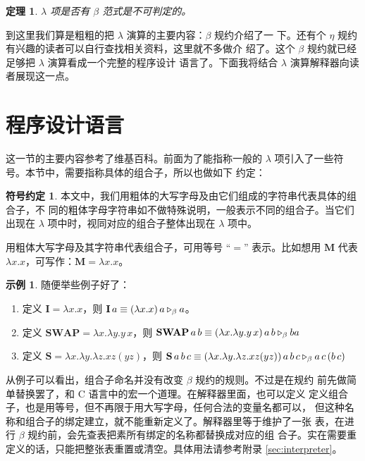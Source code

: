 \documentclass[a4paper,adobefonts]{ctexart}
\newenvironment{tightenum}{
  \begin{enumerate}
    \setlength{\itemindent}{2\ccwd}
    \setlength{\itemsep}{0cm}
    \setlength{\parskip}{0cm}
}{
  \end{enumerate}
}
\newtheorem{theorem}{定理}
\theoremstyle{definition}
\newtheorem{example}{示例}
\newtheorem{notation}{符号约定}
\begin{document}
\begin{theorem}
  $\lambda$ 项是否有 $\beta$ 范式是不可判定的。
\end{theorem}

到这里我们算是粗粗的把 $\lambda$ 演算的主要内容：$\beta$ 规约介绍了一
下。还有个 $\eta$ 规约有兴趣的读者可以自行查找相关资料，这里就不多做介
绍了。这个 $\beta$ 规约就已经足够把 $\lambda$ 演算看成一个完整的程序设计
语言了。下面我将结合 $\lambda$ 演算解释器向读者展现这一点。

\section{程序设计语言}
这一节的主要内容参考了维基百科\cite{wiki:lambda}。前面为了能指称一般的
$\lambda$ 项引入了一些符号。本节中，需要指称具体的组合子，所以也做如下
约定：
\begin{notation}\label{notation:combinator}
  本文中，我们用粗体的大写字母及由它们组成的字符串代表具体的组合子，不
  同的粗体字母字符串如不做特殊说明，一般表示不同的组合子。当它们出现在
  $\lambda$ 项中时，视同对应的组合子整体出现在 $\lambda$ 项中。

  用粗体大写字母及其字符串代表组合子，可用等号 ``$=$'' 表示。比如想用
  $\mathbf{M}$ 代表 $\lambda x.x$，可写作：$\mathbf{M}=\lambda x.x$。
\end{notation}
\begin{example}
随便举些例子好了：
\begin{tightenum}
\item 定义 $\mathbf{I}=\lambda x.x$，则 $\mathbf{I}\,a \equiv (\lambda
  x.x)\,a \triangleright_\beta a$。
\item 定义 $\mathbf{SWAP}=\lambda x.\lambda y.y\,x$，则
  $\mathbf{SWAP}\,a\, b \equiv (\lambda x.\lambda y.y\,x)\,a\,b \triangleright_\beta
  b a$
\item 定义 $\mathbf{S}=\lambda x.\lambda y.\lambda z.x z (y z)$，则 $\mathbf{S}\,a\,b\,c \equiv (\lambda x.\lambda y.\lambda z.x z (y z))\,a\,b\,c \triangleright_\beta a\,c\,(b\,c)$ 
\end{tightenum}
\end{example}
从例子可以看出，组合子命名并没有改变 $\beta$ 规约的规则。不过是在规约
前先做简单替换罢了，和 C 语言中的宏一个道理。在解释器里面，也可以定义
定义组合子，也是用等号，但不再限于用大写字母，任何合法的变量名都可以，
但这种名称和组合子的绑定建立，就不能重新定义了。解释器里等于维护了一张
表，在进行 $\beta$ 规约前，会先查表把素所有绑定的名称都替换成对应的组
合子。实在需要重定义的话，只能把整张表重置或清空。具体用法请参考附录
\ref{sec:interpreter}。
\end{document}
